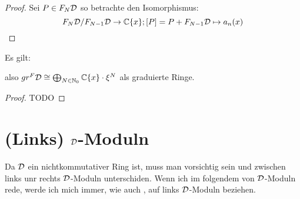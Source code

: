 \begin{proof}
Sei $P\in F_N\mathcal{D}$ so betrachte den Isomorphismus:
\[
F_N\mathcal{D}\slash F_{N-1}\mathcal{D}\rightarrow \mathbb{C}\{x\}; [P]=P+F_{N-1}\mathcal{D}\mapsto a_n(x)
\]
\end{proof}

\begin{prop}
Es gilt:
\begin{center}
\end{center}
also $gr^F\mathcal{D} \cong \bigoplus_{N\in\mathbb{N}_0}\mathbb{C}\{x\}\cdot \xi^N$ als graduierte
Ringe.
\end{prop}
\begin{proof} TODO
\begin{comment}
Treffen?
\end{comment}
\end{proof}



\section{(Links) $\mathcal{D}$-Moduln}
Da $\mathcal{D}$ ein nichtkommutativer Ring ist, muss man vorsichtig sein und zwischen
links unr rechts $\mathcal{D}$-Moduln unterschiden. Wenn ich im folgendem von
$\mathcal{D}$-Moduln rede, werde ich mich immer, wie auch \cite[Chapter
1.6.]{arapuraNotes}, auf links $\mathcal{D}$-Moduln beziehen.

